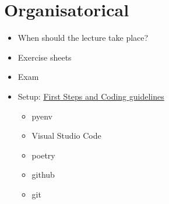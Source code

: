 \section*{Organisatorical}
\begin{frame}
    \begin{itemize}
        \item When should the lecture take place?
        \item Exercise sheets
        \item Exam
        \item Setup: \href{https://github.com/aferdina/IntroductionRL/tree/main}{First Steps and Coding guidelines} \begin{itemize}
            \item pyenv
            \item Visual Studio Code
            \item poetry
            \item github
            \item git
        \end{itemize}
    \end{itemize}
    
\end{frame}